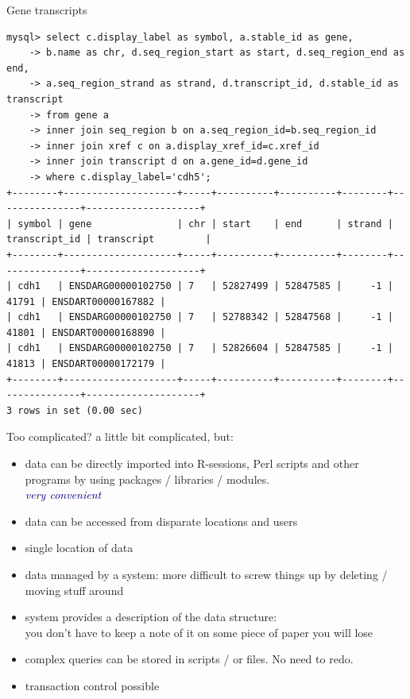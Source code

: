 \documentclass[pdf]{beamer}
\begin{document}
\begin{frame}[fragile]{Gene transcripts}
  
  {\tiny
\begin{verbatim}
mysql> select c.display_label as symbol, a.stable_id as gene,
    -> b.name as chr, d.seq_region_start as start, d.seq_region_end as end,
    -> a.seq_region_strand as strand, d.transcript_id, d.stable_id as transcript
    -> from gene a
    -> inner join seq_region b on a.seq_region_id=b.seq_region_id
    -> inner join xref c on a.display_xref_id=c.xref_id
    -> inner join transcript d on a.gene_id=d.gene_id
    -> where c.display_label='cdh5';
+--------+--------------------+-----+----------+----------+--------+---------------+--------------------+
| symbol | gene               | chr | start    | end      | strand | transcript_id | transcript         |
+--------+--------------------+-----+----------+----------+--------+---------------+--------------------+
| cdh1   | ENSDARG00000102750 | 7   | 52827499 | 52847585 |     -1 |         41791 | ENSDART00000167882 |
| cdh1   | ENSDARG00000102750 | 7   | 52788342 | 52847568 |     -1 |         41801 | ENSDART00000168890 |
| cdh1   | ENSDARG00000102750 | 7   | 52826604 | 52847585 |     -1 |         41813 | ENSDART00000172179 |
+--------+--------------------+-----+----------+----------+--------+---------------+--------------------+
3 rows in set (0.00 sec)

\end{verbatim}
}
\end{frame}

\begin{frame}{Too complicated?}
  a little bit complicated, but:
  \begin{itemize}
  \item data can be directly imported into R-sessions, Perl scripts
    and other programs by using packages / libraries / modules.\\
    \textcolor{navy}{\emph{very convenient}}
  \item data can be accessed from disparate locations and users
  \item single location of data
  \item data managed by a system: more difficult to screw things
    up by deleting / moving stuff around
  \item system provides a description of the data structure:\\
    you don't have to keep a note of it on some piece of paper you will lose
  \item complex queries can be stored in scripts / or files. No need
    to redo.
  \item transaction control possible
  \end{itemize}
\end{frame}
\end{document}

